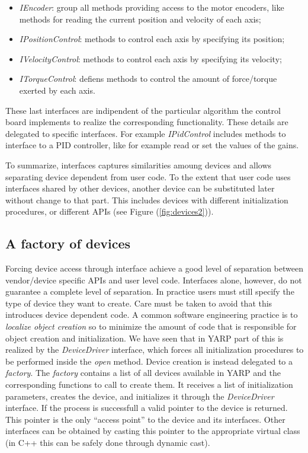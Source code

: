 \begin{itemize}

\item \emph{IEncoder}: group all methods providing access to the motor 
encoders, like methods for reading the current position and velocity of 
each axis;

\item \emph{IPositionControl}: methods to control each axis 
by specifying its position;

\item \emph{IVelocityControl}: methods to control each axis 
by specifying its velocity;

\item \emph{ITorqueControl}: defiens methods to control the amount of 
force/torque exerted by each axis.

\end{itemize}

These last interfaces are indipendent of the particular algorithm the 
control board implements to realize the corresponding functionality. 
These details are delegated to specific interfaces. For example 
\emph{IPidControl} includes methods to interface to a PID controller, 
like for example read or set the values of the gains.

To summarize, interfaces captures similarities amoung devices and 
allows separating device dependent from user code. To the 
extent that user code uses interfaces shared by other devices, 
another device can be substituted later without change to that part. This 
includes devices with different initialization procedures, or different
APIs (see Figure (\ref{fig:devices2})).

\subsection{A factory of devices}
Forcing device access through 
interface achieve a good level of separation between vendor/device 
specific APIs and user level code. Interfaces alone, however, do not 
guarantee a complete level of separation. In practice users must still 
specify the type of device they want to create. Care must be taken to 
avoid that this introduces device dependent code. A common software 
engineering practice is to \emph{localize object creation} so to 
minimize the amount of code that is responsible for object creation 
and initialization. 
We have seen that in YARP part of this is realized by the 
\emph{DeviceDriver} interface, which forces all initialization procedures 
to be performed inside the \emph{open} method. Device creation is instead 
delegated to a \emph{factory}. The \emph{factory} contains a list of 
all devices available in YARP and the corresponding functions to call 
to create them. It receives a list of initialization parameters, 
creates the device, and initializes it 
through the \emph{DeviceDriver} interface. If the process is successfull 
a valid pointer to the device is returned. This pointer is the only 
``access point'' to the device and its interfaces. Other interfaces can 
be obtained by casting this pointer to the appropriate virtual class 
(in C++ this can be safely done through dynamic cast). 

